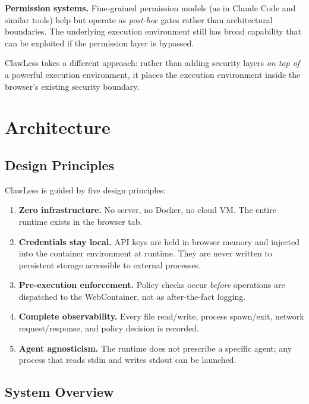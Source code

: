 \documentclass[11pt,twocolumn]{article}
\begin{document}
\textbf{Permission systems.} Fine-grained permission models (as in Claude Code and similar tools) help but operate as \emph{post-hoc} gates rather than architectural boundaries. The underlying execution environment still has broad capability that can be exploited if the permission layer is bypassed.

ClawLess takes a different approach: rather than adding security layers \emph{on top of} a powerful execution environment, it places the execution environment inside the browser's existing security boundary.

\section{Architecture}
\label{sec:architecture}

\subsection{Design Principles}

ClawLess is guided by five design principles:

\begin{enumerate}[noitemsep]
  \item \textbf{Zero infrastructure.} No server, no Docker, no cloud VM. The entire runtime exists in the browser tab.
  \item \textbf{Credentials stay local.} API keys are held in browser memory and injected into the container environment at runtime. They are never written to persistent storage accessible to external processes.
  \item \textbf{Pre-execution enforcement.} Policy checks occur \emph{before} operations are dispatched to the WebContainer, not as after-the-fact logging.
  \item \textbf{Complete observability.} Every file read/write, process spawn/exit, network request/response, and policy decision is recorded.
  \item \textbf{Agent agnosticism.} The runtime does not prescribe a specific agent; any process that reads stdin and writes stdout can be launched.
\end{enumerate}

\subsection{System Overview}
\end{document}

